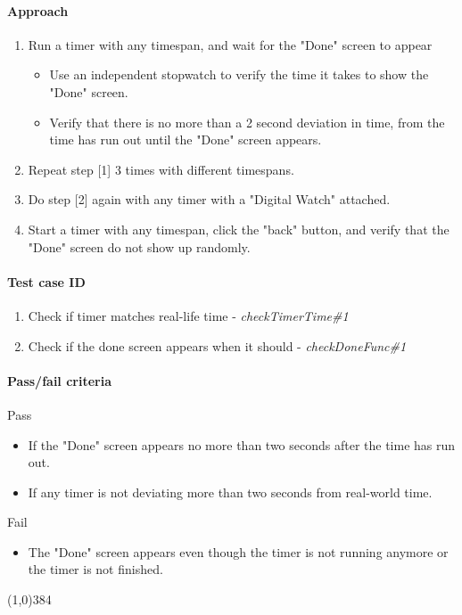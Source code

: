 \paragraph{Approach}
	\begin{enumerate} 
		\item Run a timer with any timespan, and wait for the "Done" screen to appear
			\begin{itemize}
				\item Use an independent stopwatch to verify the time it takes to show the "Done" screen.
				\item Verify that there is no more than a 2 second deviation in time, from the time has run out until the "Done" screen appears.
			\end{itemize}
		\item Repeat step [1] 3 times with different timespans.
		\item Do step [2] again with any timer with a "Digital Watch" attached.
		\item Start a timer with any timespan, click the "back" button, and verify that the "Done" screen do not show up randomly.
	\end{enumerate}
\paragraph{Test case ID}
	\begin{enumerate}
		\item Check if timer matches real-life time - \textit{checkTimerTime\#1}
		\item Check if the done screen appears when it should - \textit{checkDoneFunc\#1}
	\end{enumerate}
\paragraph{Pass/fail criteria}
	Pass
	\begin{itemize}
		\item If the "Done" screen appears no more than two seconds after the time has run out.
		\item If any timer is not deviating more than two seconds from real-world time.
	\end{itemize}
	Fail
	\begin{itemize}
		\item The "Done" screen appears even though the timer is not running anymore or the timer is not finished.
	\end{itemize}
\begin{center}
	\line(1,0){384}
\end{center}